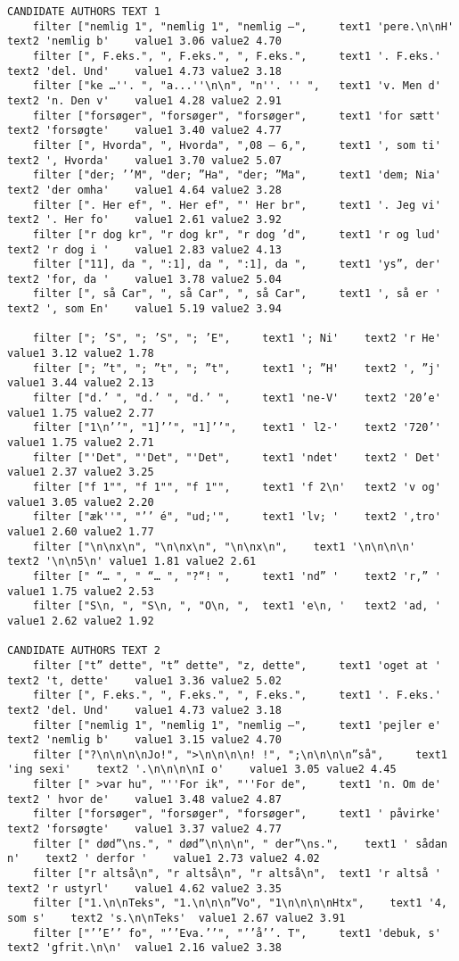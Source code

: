 {
\small
\begin{verbatim}
CANDIDATE AUTHORS TEXT 1
	filter ["nemlig 1", "nemlig 1", "nemlig –", 	text1 'pere.\n\nH'	text2 'nemlig b'	value1 3.06	value2 4.70
	filter [", F.eks.", ", F.eks.", ", F.eks.", 	text1 '. F.eks.'	text2 'del. Und'	value1 4.73	value2 3.18
	filter ["ke …''. ", "a...''\n\n", "n''. '' ", 	text1 'v. Men d'	text2 'n. Den v'	value1 4.28	value2 2.91
	filter ["forsøger", "forsøger", "forsøger", 	text1 'for sætt'	text2 'forsøgte'	value1 3.40	value2 4.77
	filter [", Hvorda", ", Hvorda", ",08 – 6,", 	text1 ', som ti'	text2 ', Hvorda'	value1 3.70	value2 5.07
	filter ["der; ’’M", "der; ”Ha", "der; ”Ma", 	text1 'dem; Nia'	text2 'der omha'	value1 4.64	value2 3.28
	filter [". Her ef", ". Her ef", "' Her br", 	text1 '. Jeg vi'	text2 '. Her fo'	value1 2.61	value2 3.92
	filter ["r dog kr", "r dog kr", "r dog ’d", 	text1 'r og lud'	text2 'r dog i '	value1 2.83	value2 4.13
	filter ["11], da ", ":1], da ", ":1], da ", 	text1 'ys”, der'	text2 'for, da '	value1 3.78	value2 5.04
	filter [", så Car", ", så Car", ", så Car", 	text1 ', så er '	text2 ', som En'	value1 5.19	value2 3.94

	filter ["; ’S", "; ’S", "; ’E", 	text1 '; Ni'	text2 'r He'	value1 3.12	value2 1.78
	filter ["; ”t", "; ”t", "; ”t", 	text1 '; ”H'	text2 ', ”j'	value1 3.44	value2 2.13
	filter ["d.’ ", "d.’ ", "d.’ ", 	text1 'ne-V'	text2 '20’e'	value1 1.75	value2 2.77
	filter ["1\n’’", "1]’’", "1]’’", 	text1 ' l2-'	text2 '720’'	value1 1.75	value2 2.71
	filter ["'Det", "'Det", "'Det", 	text1 'ndet'	text2 ' Det'	value1 2.37	value2 3.25
	filter ["f 1"", "f 1"", "f 1"", 	text1 'f 2\n'	text2 'v og'	value1 3.05	value2 2.20
	filter ["æk''", "’’ é", "ud;'", 	text1 'lv; '	text2 ',tro'	value1 2.60	value2 1.77
	filter ["\n\nx\n", "\n\nx\n", "\n\nx\n", 	text1 '\n\n\n\n'	text2 '\n\n5\n'	value1 1.81	value2 2.61
	filter [" “… ", " “… ", "?“! ", 	text1 'nd” '	text2 'r,” '	value1 1.75	value2 2.53
	filter ["S\n, ", "S\n, ", "O\n, ", 	text1 'e\n, '	text2 'ad, '	value1 2.62	value2 1.92

CANDIDATE AUTHORS TEXT 2
	filter ["t” dette", "t” dette", "z, dette", 	text1 'oget at '	text2 't, dette'	value1 3.36	value2 5.02
	filter [", F.eks.", ", F.eks.", ", F.eks.", 	text1 '. F.eks.'	text2 'del. Und'	value1 4.73	value2 3.18
	filter ["nemlig 1", "nemlig 1", "nemlig –", 	text1 'pejler e'	text2 'nemlig b'	value1 3.15	value2 4.70
	filter ["?\n\n\n\nJo!", ">\n\n\n\n! !", ";\n\n\n\n”så", 	text1 'ing sexi'	text2 '.\n\n\n\nI o'	value1 3.05	value2 4.45
	filter [" >var hu", "''For ik", "''For de", 	text1 'n. Om de'	text2 ' hvor de'	value1 3.48	value2 4.87
	filter ["forsøger", "forsøger", "forsøger", 	text1 ' påvirke'	text2 'forsøgte'	value1 3.37	value2 4.77
	filter [" død”\ns.", " død”\n\n\n", " der”\ns.", 	text1 ' sådan n'	text2 ' derfor '	value1 2.73	value2 4.02
	filter ["r altså\n", "r altså\n", "r altså\n", 	text1 'r altså '	text2 'r ustyrl'	value1 4.62	value2 3.35
	filter ["1.\n\nTeks", "1.\n\n\n”Vo", "1\n\n\n\nHtx", 	text1 '4, som s'	text2 's.\n\nTeks'	value1 2.67	value2 3.91
	filter ["’’E’’ fo", "’’Eva.’’", "’’å’’. T", 	text1 'debuk, s'	text2 'gfrit.\n\n'	value1 2.16	value2 3.38


\end{verbatim}}
